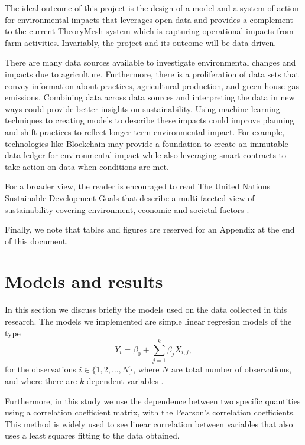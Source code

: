 \documentclass[11pt]{article}
\numberwithin{equation}{section}
\begin{document}
The ideal outcome of this project is the design of a model and a system of action for environmental impacts that leverages open data and provides a complement to the current TheoryMesh system which is capturing operational impacts from farm activities. Invariably, the project and its outcome will be data driven.

There are many data sources available to investigate environmental changes and impacts due to agriculture. Furthermore, there is a proliferation of data sets that convey information about practices, agricultural production, and green house gas emissions. Combining data across data sources and interpreting the data in new ways could provide better insights on sustainability. Using machine learning techniques to creating models to describe these impacts could improve planning and shift practices to reflect longer term environmental impact. For example, technologies like Blockchain may provide a foundation to create an immutable data ledger for environmental impact while also leveraging smart contracts to take action on data when conditions are met.

For a broader view, the reader is encouraged to read The United Nations Sustainable Development Goals that describe a multi-faceted view of sustainability covering environment, economic and societal factors \cite{UN-edgar}.

Finally, we note that tables and figures are reserved for an Appendix at the end of this document.


\section{Models and results}\label{Corr_modl}

In this section we discuss briefly the models used on the data collected  in this research. The models we implemented are simple linear regresion models of the type 
\begin{equation}
Y_i = \beta_0 + \sum_{j=1}^k \beta_j X_{i,j},    
\end{equation}
 for the observations $i\in \{1, 2, \dots, N\}$, where $N$ are total number of observations, and where there are $k$ dependent variables .
 
 Furthermore, in this study we use the dependence between two specific quantities using  a correlation coefficient matrix, with  the Pearson's correlation coefficients. This method is widely used to see linear correlation between variables that also uses a least squares fitting to the data obtained.
\end{document}
